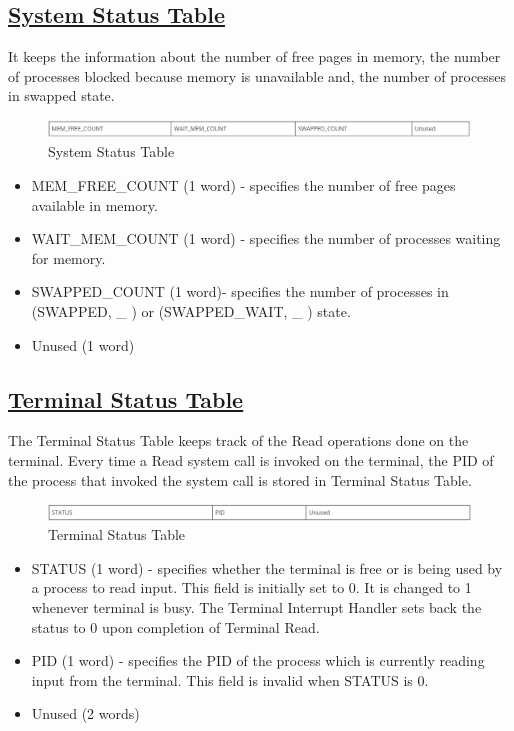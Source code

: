\subsection{\href{http://exposnitc.github.io/os_design-files/mem_ds.html#ss_table}{System Status Table}}
It keeps the information about the number of free pages in memory, the number of processes blocked because memory is unavailable and, the number of processes in swapped state. 
\begin{figure}[ht]
\centering
\includegraphics  [scale=0.55]{figures/sst.png}
\caption{\footnotesize System Status Table}
\end{figure}
\begin {itemize}
\item MEM\_FREE\_COUNT (1 word) - specifies the number of free pages available in memory.
\item WAIT\_MEM\_COUNT (1 word) - specifies the number of processes waiting for memory.
\item SWAPPED\_COUNT (1 word)- specifies the number of processes in (SWAPPED, \_ ) or (SWAPPED\_WAIT, \_ ) state.
\item Unused (1 word)
\end {itemize}

\subsection{\href{http://exposnitc.github.io/os_design-files/mem_ds.html#ts_table}{Terminal Status Table}}
The Terminal Status Table keeps track of the Read operations done on the terminal. Every time a Read system call is invoked on the terminal, the PID of the process that invoked the system call is stored in Terminal Status Table. 
\begin{figure}[ht]
\centering
\includegraphics  [scale=0.55]{figures/ts.png}
\caption{\footnotesize Terminal Status Table}
\label{fig_1}
\end{figure}
\begin {itemize}

\item STATUS (1 word) - specifies whether the terminal is free or is being used by a process to read input. This field is initially set to 0. It is changed to 1 whenever terminal is busy. The Terminal Interrupt Handler sets back the status to 0 upon completion of Terminal Read.
\item PID (1 word) - specifies the PID of the process which is currently reading input from the terminal. This field is invalid when STATUS is 0.
\item Unused (2 words)
\end {itemize}
